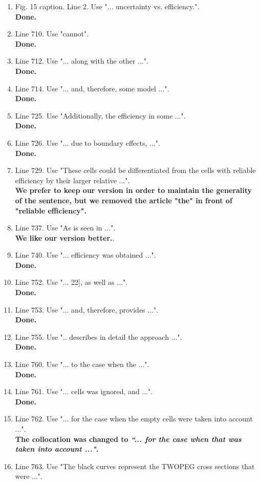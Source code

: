 \documentclass[,superscriptaddress,showpacs,amssymb,amsmath,amsfonts,linenumbers,article]{revtex4-1}
\begin{document}
\begin{itemize}
\begin{enumerate}
\item Fig. 15 caption. Line 2. Use "... uncertainty vs. efficiency.".\\
{\bf Done.}
\item Line 710. Use "cannot".\\
{\bf Done.}
\item Line 712. Use "... along with the other ...".\\
{\bf Done.}
\item Line 714. Use "... and, therefore, some model ...".\\
{\bf Done.}
\item Line 725. Use "Additionally, the efficiency in some ...".\\
{\bf Done.}
\item Line 726. Use "... due to boundary effects, ...".\\
{\bf Done.}
\item Line 729. Use "These cells could be differentiated from the cells with reliable efficiency by their larger relative ...".\\
{\bf We prefer to keep our version in order to maintain the generality of the sentence, but we removed the article "the" in front of "reliable efficiency".}
\item Line 737. Use "As is seen in ...".\\
{\bf We like our version better.}.
\item Line 740. Use "... efficiency was obtained ...".\\
{\bf Done.}
\item Line 752. Use "... 22], as well as ...".\\
{\bf Done.}
\item Line 753. Use "... and, therefore, provides ...".\\
{\bf Done.}
\item Line 755. Use ".. describes in detail the approach ...".\\
{\bf Done.}
\item Line 760. Use "... to the case when the ...".\\
{\bf Done.}
\item Line 761. Use "... cells was ignored, and ...".\\
{\bf Done.}
\item Line 762. Use "... for the case when the empty cells were taken into account ...".\\
{\bf The collocation was changed to {\it ``... for the case when that was taken into account ..."}.}
\item Line 763. Use "The black curves represent the TWOPEG cross sections that were ...".\\

\end{enumerate}
\end{itemize}
\end{document}
